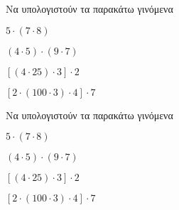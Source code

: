 Να υπολογιστούν τα παρακάτω γινόμενα
\begin{multicols}{2}
\begin{rlist}
\item $ 5\cdot\left( 7\cdot8\right)  $
\item $ (4\cdot5)\cdot(9\cdot7) $
\item $ [(4\cdot25)\cdot3]\cdot2 $
\item $ [2\cdot(100\cdot3)\cdot4]\cdot7 $
\end{rlist}
\end{multicols}
Να υπολογιστούν τα παρακάτω γινόμενα
\begin{multicols}{2}
\begin{rlist}
\item $ 5\cdot\left( 7\cdot8\right)  $
\item $ (4\cdot5)\cdot(9\cdot7) $
\item $ [(4\cdot25)\cdot3]\cdot2 $
\item $ [2\cdot(100\cdot3)\cdot4]\cdot7 $
\end{rlist}
\end{multicols}
